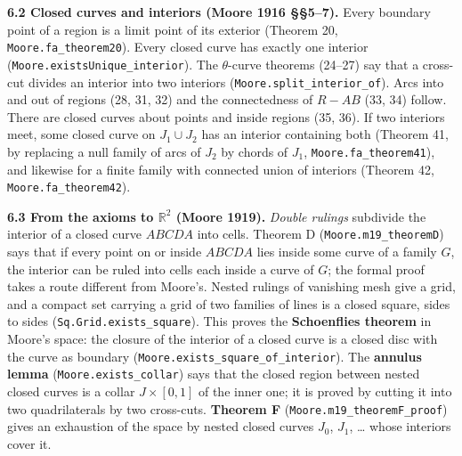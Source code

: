 \documentclass[11pt]{article}
\newcommand{\lean}[1]{\texttt{#1}}
\begin{document}
\textbf{6.2 Closed curves and interiors (Moore 1916 \S{}\S{}5--7).} Every boundary point of a region is a limit point of its exterior (Theorem 20, \lean{Moore.\hspace{0pt}fa\_\hspace{0pt}theorem20}). Every closed curve has exactly one interior (\lean{Moore.\hspace{0pt}existsUnique\_\hspace{0pt}interior}). The $\theta$-curve theorems (24--27) say that a cross-cut divides an interior into two interiors (\lean{Moore.\hspace{0pt}split\_\hspace{0pt}interior\_\hspace{0pt}of}). Arcs into and out of regions (28, 31, 32) and the connectedness of $R - AB$ (33, 34) follow. There are closed curves about points and inside regions (35, 36). If two interiors meet, some closed curve on $J_1 \cup J_2$ has an interior containing both (Theorem 41, by replacing a null family of arcs of $J_2$ by chords of $J_1$, \lean{Moore.\hspace{0pt}fa\_\hspace{0pt}theorem41}), and likewise for a finite family with connected union of interiors (Theorem 42, \lean{Moore.\hspace{0pt}fa\_\hspace{0pt}theorem42}).

\textbf{6.3 From the axioms to $\mathbb{R}^2$ (Moore 1919).} \emph{Double rulings} subdivide the interior of a closed curve $ABCDA$ into cells. Theorem D (\lean{Moore.\hspace{0pt}m19\_\hspace{0pt}theoremD}) says that if every point on or inside $ABCDA$ lies inside some curve of a family $G$, the interior can be ruled into cells each inside a curve of $G$; the formal proof takes a route different from Moore's. Nested rulings of vanishing mesh give a grid, and a compact set carrying a grid of two families of lines is a closed square, sides to sides (\lean{Sq.\hspace{0pt}Grid.\hspace{0pt}exists\_\hspace{0pt}square}). This proves the \textbf{Schoenflies theorem} in Moore's space: the closure of the interior of a closed curve is a closed disc with the curve as boundary (\lean{Moore.\hspace{0pt}exists\_\hspace{0pt}square\_\hspace{0pt}of\_\hspace{0pt}interior}). The \textbf{annulus lemma} (\lean{Moore.\hspace{0pt}exists\_\hspace{0pt}collar}) says that the closed region between nested closed curves is a collar $J \times [0, 1]$ of the inner one; it is proved by cutting it into two quadrilaterals by two cross-cuts. \textbf{Theorem F} (\lean{Moore.\hspace{0pt}m19\_\hspace{0pt}theoremF\_\hspace{0pt}proof}) gives an exhaustion of the space by nested closed curves $J_0$, $J_1$, \dots{} whose interiors cover it.
\end{document}
